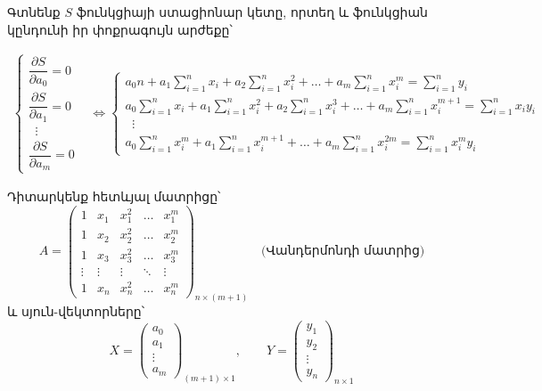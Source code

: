 \documentclass[12pt,a4paper]{article}
\numberwithin{equation}{section}
\numberwithin{figure}{section}
\begin{document}
Գտնենք $S$ ֆունկցիայի ստացիոնար կետը, որտեղ և ֆունկցիան կընդունի իր փոքրագույն արժեքը՝

\begin{align}
\begin{cases}
\dfrac{\partial S}{\partial a_0} = 0 \\[8pt]
\dfrac{\partial S}{\partial a_1} = 0 \\[4pt]
\;\;\vdots \\[4pt]
\dfrac{\partial S}{\partial a_m} = 0
\end{cases}
&\Longleftrightarrow
\begin{cases}
\displaystyle a_0 n + a_1 \sum_{i=1}^n x_i + a_2 \sum_{i=1}^n x_i^2 + \dots + a_m \sum_{i=1}^n x_i^m = \sum_{i=1}^n y_i \\[14pt]
\displaystyle a_0 \sum_{i=1}^n x_i + a_1 \sum_{i=1}^n x_i^2 + a_2 \sum_{i=1}^n x_i^3 + \dots + a_m \sum_{i=1}^n x_i^{m+1} = \sum_{i=1}^n x_i y_i \\[8pt]
\;\;\vdots \\[8pt]
\displaystyle a_0 \sum_{i=1}^n x_i^m + a_1 \sum_{i=1}^n x_i^{m+1} + \dots + a_m \sum_{i=1}^n x_i^{2m} = \sum_{i=1}^n x_i^m y_i
\end{cases}
\label{eq:poly_system}
\end{align}

Դիտարկենք հետևյալ մատրիցը՝
\[
A =
\begin{pmatrix}
1 & x_1 & x_1^2 & \dots & x_1^m \\
1 & x_2 & x_2^2 & \dots & x_2^m \\
1 & x_3 & x_3^2 & \dots & x_3^m \\
\vdots & \vdots & \vdots & \ddots & \vdots \\
1 & x_n & x_n^2 & \dots & x_n^m
\end{pmatrix}_{n \times (m+1)} \quad \text{(Վանդերմոնդի մատրից)}
\]
և սյուն-վեկտորները՝
\[
X =
\begin{pmatrix}
a_0 \\
a_1 \\
\vdots \\
a_m
\end{pmatrix}_{(m+1) \times 1},
\qquad
Y =
\begin{pmatrix}
y_1 \\
y_2 \\
\vdots \\
y_n
\end{pmatrix}_{n \times 1}
\]
\end{document}
